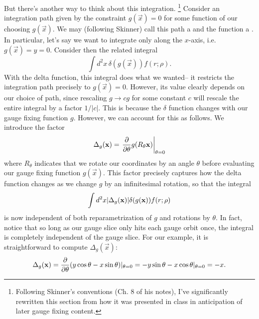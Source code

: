 But there's another way to think about this integration.%
    \footnote{Following Skinner's conventions (Ch. 8 of his notes), I've significantly rewritten this section from how it was presented in class in anticipation of later gauge fixing content.}
Consider an integration path given by the constraint $g(\vec x)=0$ for some function of our choosing $g(\vec x)$. We may (following Skinner) call this path a  and the function a . In particular, let's say we want to integrate only along the $x$-axis, i.e. $g(\vec x)=y=0$. Consider then the related integral
\begin{equation}
    \int d^2x \, \delta(g(\vec x)) f(r;\rho).
\end{equation}
With the delta function, this integral does what we wanted-- it restricts the integration path precisely to $g(\vec x)=0$. However, its value clearly depends on our choice of path, since rescaling $g\to cg$ for some constant $c$ will rescale the entire integral by a factor $1/|c|$. This is because the $\delta$ function changes with our gauge fixing function $g$. However, we can account for this as follows. We introduce the factor
\begin{equation}
    \Delta_g (\vec x)=\left.\P{}{\theta}g(R_\theta \vec x)\right|_{\theta=0}
\end{equation}
where $R_\theta$ indicates that we rotate our coordinates by an angle $\theta$ before evaluating our gauge fixing function $g(\vec x)$. This factor precisely captures how the delta function changes as we change $g$ by an infinitesimal rotation, so that the integral
\begin{equation}
    \int d^2x \abs{\Delta_g(\vec x)} \delta(g(\vec x)) f(r;\rho)
\end{equation}
is now independent of both reparametrization of $g$ and rotations by $\theta$. In fact, notice that so long as our gauge slice only hits each gauge orbit once, the integral is completely independent of the gauge slice. For our example, it is straightforward to compute $\Delta_g(\vec x)$:
\begin{equation}
    \Delta_g(\vec x) = \P{}{\theta}(y\cos\theta - x\sin\theta)|_{\theta=0}= -y\sin\theta -x\cos\theta|_{\theta=0}=-x.
\end{equation}

